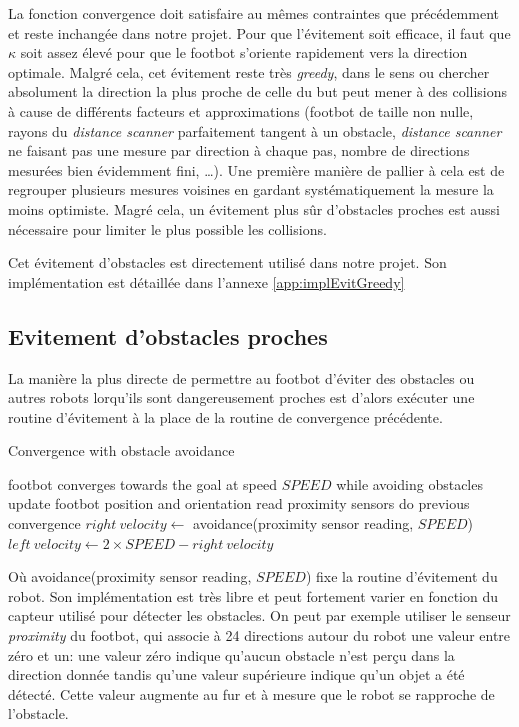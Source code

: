 La fonction convergence doit satisfaire au mêmes contraintes que précédemment et reste inchangée dans notre projet. Pour que l'évitement soit efficace, il faut que $\kappa$ soit assez élevé pour que le footbot s'oriente rapidement vers la direction optimale. Malgré cela, cet évitement reste très \emph{greedy}, dans le sens ou chercher absolument la direction la plus proche de celle du but peut mener à des collisions à cause de différents facteurs et approximations (footbot de taille non nulle, rayons du \emph{distance scanner} parfaitement tangent à un obstacle, \emph{distance scanner} ne faisant pas une mesure par direction à chaque pas, nombre de directions mesurées bien évidemment fini, \ldots). Une première manière de pallier à cela est de regrouper plusieurs mesures voisines en gardant systématiquement la mesure la moins optimiste. Magré cela, un évitement plus sûr d'obstacles proches est aussi nécessaire pour limiter le plus possible les collisions.

Cet évitement d'obstacles est directement utilisé dans notre projet. Son implémentation est détaillée dans l'annexe \ref{app:implEvitGreedy}

\subsection{Evitement d'obstacles proches}

La manière la plus directe de permettre au footbot d'éviter des obstacles ou autres robots lorqu'ils sont dangereusement proches est d'alors exécuter une routine d'évitement à la place de la routine de convergence précédente.
\begin{algorithm}
\label{obstacleConvergence}
\caption{Convergence with obstacle avoidance}
\begin{algorithmic}
  \ENSURE footbot converges towards the goal at speed \(SPEED\) while avoiding obstacles
    \STATE update footbot position and orientation
    \STATE read proximity sensors 
      \STATE do previous convergence
    \ELSE
      \STATE \( right\:velocity \leftarrow\) avoidance(proximity sensor reading, \(SPEED\))
    \ENDIF
    \STATE \( left\:velocity \leftarrow 2 \times SPEED-right\:velocity\) 
  \ENDWHILE
\end{algorithmic}
\end{algorithm}

Où avoidance(proximity sensor reading, $SPEED$) fixe la routine d'évitement du robot. Son implémentation est très libre et peut fortement varier en fonction du capteur utilisé pour détecter les obstacles. On peut par exemple utiliser le senseur \emph{proximity} du footbot, qui associe à 24 directions autour du robot une valeur entre zéro et un: une valeur zéro indique qu'aucun obstacle n'est perçu dans la direction donnée tandis qu'une valeur supérieure indique qu'un objet a été détecté. Cette valeur augmente au fur et à mesure que le robot se rapproche de l'obstacle.~\cite{argosSite1}

